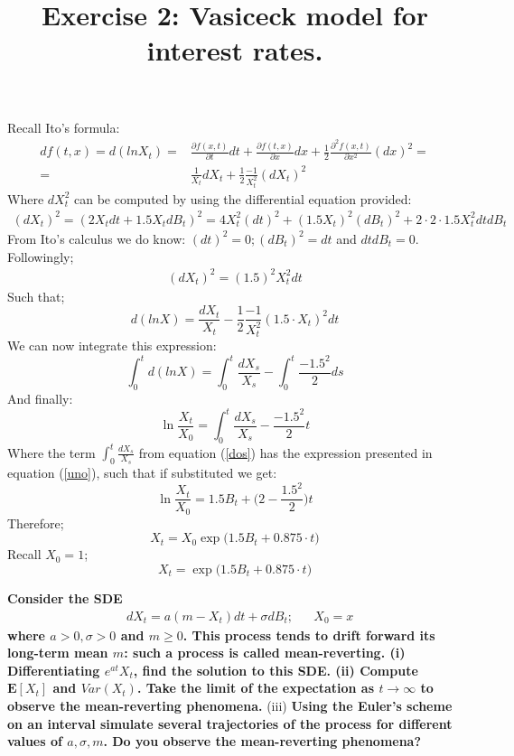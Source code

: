 \documentclass[12pt]{article}
\begin{document}
Recall Ito's formula:
\begin{align}
df(t,x) = d(lnX_t) =& \frac{\partial f(x,t)}{\partial t} dt + \frac{\partial f(t,x)}{\partial x}dx + \frac{1}{2}\frac{\partial^2f(x,t)}{\partial x^2}(dx)^2= \\
= & \frac{1}{X_t}dX_t +\frac{1}{2}\frac{-1}{X_t^2}(dX_t)^2  
\end{align}
Where $dX_t^2$ can be computed by using the differential equation provided:
\begin{align}
(dX_t)^2   = (2X_tdt+1.5X_tdB_t)^2 = 4X_t^2(dt)^2 + (1.5X_t)^2(dB_t)^2+2\cdot2\cdot1.5X_t^2dtdB_t
\end{align}
From Ito's calculus we do know: $(dt)^2=0; (dB_t)^2=dt$ and $dtdB_t=0$. Followingly;
\begin{align}
(dX_t)^2   = (1.5)^2X_t^2dt
\end{align}
Such that;
\begin{equation}
d(lnX) = \frac{dX_t}{X_t} - \frac{1}{2}\frac{-1}{X_t^2}(1.5 \cdot X_t)^2 dt  
\end{equation}
We can now integrate this expression:
\begin{equation}
\int_0^t d(lnX) = \int_0^t \frac{dX_s}{X_s} - \int_0^t \frac{-1.5^2}{2} ds   
\end{equation}
And finally:
\begin{equation}\label{dos}
\ln \frac{X_t}{X_0} =  \int_0^t \frac{dX_s}{X_s} -  \frac{-1.5^2}{2} t
\end{equation}
Where the term $\int_0^t \frac{dX_s}{X_s}$ from equation (\ref{dos}) has the expression presented in equation (\ref{uno}), such that if substituted we get:
\begin{equation}
\ln \frac{X_t}{X_0} = 1.5B_t + \bigg(2-\frac{1.5^2}{2}\bigg)t
\end{equation}
Therefore;
\begin{equation}
X_t = X_0 \exp\bigg(1.5B_t+0.875\cdot t\bigg)
\end{equation}
Recall $X_0=1$;
\begin{equation}
\boxed{X_t = \exp\bigg(1.5B_t+0.875\cdot t\bigg)}
\end{equation}
\title {{\bf Exercise 2:} {\bf Vasiceck model for interest rates. }}
{\bf Consider the SDE}
\begin{align*}
&dX_t = a(m-X_t)dt + \sigma dB_t; && X_0=x
\end{align*}
{\bf where $a>0, \sigma >0$ and $m\ge 0$. This process tends to drift forward its long-term mean $m$: such a process is called mean-reverting. 
(i) {\bf Differentiating $e^{at}X_t$, find the solution to this SDE.}
(ii) {\bf Compute $\mathbf{E}[X_t]$} and $Var(X_t)$. Take the limit of the expectation as $t\longrightarrow \infty$ to observe the mean-reverting phenomena.}
(iii) {\bf Using the Euler's scheme on an interval simulate several trajectories of the process for different values of $a,\sigma, m$. Do you observe the mean-reverting phenomena? } \\
\end{document}
